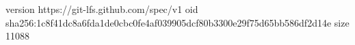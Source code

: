 version https://git-lfs.github.com/spec/v1
oid sha256:1c8f41dc8a6fda1de0cbc0fe4af039905dcf80b3300e29f75d65bb586df2d14e
size 11088
